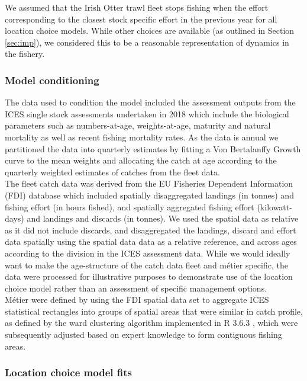 \documentclass[12pt, halfline, a4paper]{ouparticle}
\begin{document}
We assumed that the Irish Otter trawl fleet stops fishing when the effort
corresponding to the closest stock specific effort in the previous year for all
location choice models. While other choices are available (as outlined in
Section \ref{sec:imp}), we considered this to be a reasonable representation of
dynamics in the fishery. 

\subsubsection{Model conditioning}

The data used to condition the model included the assessment outputs from the
ICES single stock assessments undertaken in 2018 \citep{ICES2018} which include
the biological parameters such as numbers-at-age, weights-at-age, maturity and
natural mortality as well as recent fishing mortality rates. As the data is
annual we partitioned the data into quarterly estimates by fitting a Von
Bertalanffy Growth curve to the mean weights and allocating the catch at age
according to the quarterly weighted estimates of catches from the fleet data.
\\

The fleet catch data was derived from the EU Fisheries Dependent Information
(FDI) database \citep{STECF2017} which included spatially disaggregated
landings (in tonnes) and fishing effort (in hours fished), and spatially
aggregated fishing effort (kilowatt-days) and landings and discards (in
tonnes). We used the spatial data as relative as it did not include discards,
and disaggregated the landings, discard and effort data spatially using the
spatial data data as a relative reference, and across ages according to the
division in the ICES assessment data. While we would ideally want to make the
age-structure of the catch data fleet and métier specific, the data were
processed for illustrative purposes to demonstrate use of the location choice
model rather than an assessment of specific management options. \\

Métier were defined by using the FDI spatial data set to aggregate ICES
statistical rectangles into groups of spatial areas that were similar in catch
profile, as defined by the ward clustering algorithm implemented in R 3.6.3
\citep{Team2020}, which were subsequently adjusted based on expert knowledge to
form contiguous fishing areas. \\ 

\subsubsection{Location choice model fits}
\end{document}
